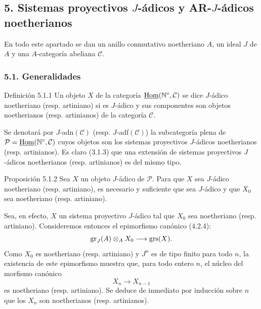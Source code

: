 \subsection*{5. Sistemas proyectivos \(J\)-ádicos y AR-\(J\)-ádicos noetherianos}

En todo este apartado se dan un anillo conmutativo noetheriano \(A\), un ideal \(J\) de \(A\) y una \(A\)-categoría abeliana \(\mathcal C\).

\subsubsection*{5.1. Generalidades}

\begin{statement}{Definición 5.1.1}
Un objeto \(X\) de la categoría \(\underline{\operatorname{Hom}}(\mathbb N^\circ,\mathcal C)\) se dice \(J\)-ádico noetheriano (resp. artiniano) si es \(J\)-ádico y sus componentes son objetos noetherianos (resp. artinianos) de la categoría \(\mathcal C\).
\end{statement}

Se denotará por \(J\)-adn\((\mathcal C)\) (resp. \(J\)-adf\((\mathcal C)\)) la subcategoría plena de
\(\mathcal P=\underline{\operatorname{Hom}}(\mathbb N^\circ,\mathcal C)\) cuyos objetos son los sistemas proyectivos \(J\)-ádicos noetherianos (resp. artinianos). Es claro (3.1.3) que una extensión de sistemas proyectivos \(J\)-ádicos noetherianos (resp. artinianos) es del mismo tipo.

\begin{statement}{Proposición 5.1.2}
Sea \(X\) un objeto \(J\)-ádico de \(\mathcal P\). Para que \(X\) sea \(J\)-ádico noetheriano (resp. artiniano), es necesario y suficiente que sea \(J\)-ádico y que \(X_0\) sea noetheriano (resp. artiniano).
\end{statement}

\begin{prooftext}
Sea, en efecto, \(X\) un sistema proyectivo \(J\)-ádico tal que \(X_0\) sea noetheriano (resp. artiniano). Consideremos entonces el epimorfismo canónico (4.2.4):
\[
\operatorname{gr}_J(A)\otimes_A X_0\longrightarrow \operatorname{grs}(X).
\]
Como \(X_0\) es noetheriano (resp. artiniano) y \(J^n\) es de tipo finito para todo \(n\), la existencia de este epimorfismo muestra que, para todo entero \(n\), el núcleo del morfismo canónico
\[
X_n\longrightarrow X_{n-1}
\]
es noetheriano (resp. artiniano). Se deduce de inmediato por inducción sobre \(n\) que los \(X_n\) son noetherianos (resp. artinianos).
\end{prooftext}

